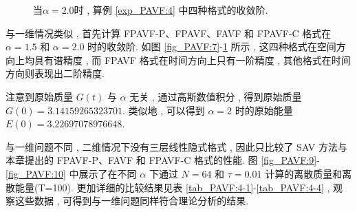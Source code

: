 			
			\begin{figure}[H]
				\begin{center}
				\caption{当$\alpha=2.0$时 , 算例 \ref{exp_PAVF:4}  中四种格式的收敛阶.}
				 \label{fig_PAVF:8}
				\end{center}
				\end{figure}
	与一维情况类似 , 首先计算 FPAVF-P、FPAVF、FAVF 和 FPAVF-C 格式在 $\alpha=1.5$ 和 $\alpha=2.0$ 时的收敛阶.
	如图 \ref{fig_PAVF:7}-\ref{fig_PAVF:8} 所示 , 这四种格式在空间方向上均具有谱精度 , 而 FPAVF 格式在时间方向上只有一阶精度 , 其他格式在时间方向则表现出二阶精度.
		
	注意到原始质量 $G(t)$ 与 $\alpha$ 无关 , 通过高斯数值积分 , 得到原始质量 $G(0)=3.14159265323701$.
	类似地 , 可以得到 $\alpha=2$ 时的原始能量 $E(0)=3.22697078976648$.

	与一维问题不同 , 二维情况下没有三层线性隐式格式 , 因此只比较了 SAV 方法与本章提出的 FPAVF-P、FAVF 和 FPAVF-C 格式的性能.
	图 \ref{fig_PAVF:9}-\ref{fig_PAVF:10} 中展示了在不同 $\alpha$ 下通过 $N=64$ 和 $\tau=0.01$ 计算的离散质量和离散能量(T=100).
	更加详细的比较结果见表 \ref{tab_PAVF:4-1}-\ref{tab_PAVF:4-4} , 观察这些数据 , 可得到与一维问题同样符合理论分析的结果.

